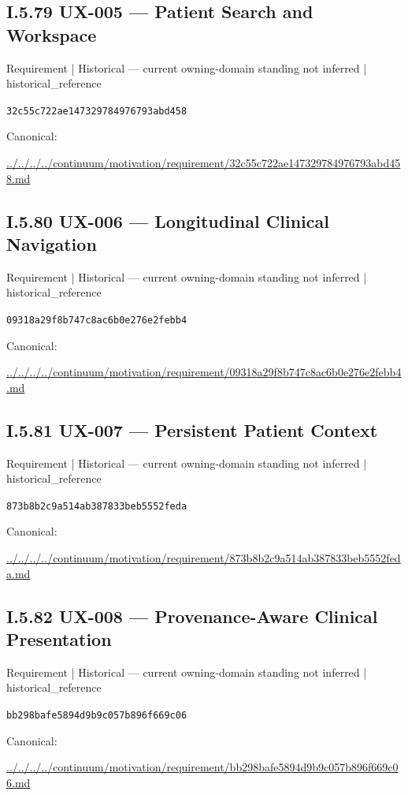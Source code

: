 \documentclass[10pt,a4paper]{article}
\begin{document}
\subsection*{I.5.79 UX-005 — Patient Search and Workspace}
{\small Requirement | Historical — current owning-domain standing not inferred | historical\_reference}\par
\texttt{32c55c722ae147329784976793abd458}\par
Canonical: \par
{\footnotesize\url{../../../../continuum/motivation/requirement/32c55c722ae147329784976793abd458.md}}\par
\subsection*{I.5.80 UX-006 — Longitudinal Clinical Navigation}
{\small Requirement | Historical — current owning-domain standing not inferred | historical\_reference}\par
\texttt{09318a29f8b747c8ac6b0e276e2febb4}\par
Canonical: \par
{\footnotesize\url{../../../../continuum/motivation/requirement/09318a29f8b747c8ac6b0e276e2febb4.md}}\par
\subsection*{I.5.81 UX-007 — Persistent Patient Context}
{\small Requirement | Historical — current owning-domain standing not inferred | historical\_reference}\par
\texttt{873b8b2c9a514ab387833beb5552feda}\par
Canonical: \par
{\footnotesize\url{../../../../continuum/motivation/requirement/873b8b2c9a514ab387833beb5552feda.md}}\par
\subsection*{I.5.82 UX-008 — Provenance-Aware Clinical Presentation}
{\small Requirement | Historical — current owning-domain standing not inferred | historical\_reference}\par
\texttt{bb298bafe5894d9b9c057b896f669c06}\par
Canonical: \par
{\footnotesize\url{../../../../continuum/motivation/requirement/bb298bafe5894d9b9c057b896f669c06.md}}\par
\end{document}
